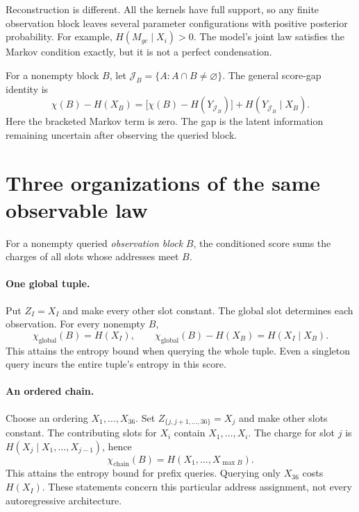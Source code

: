 \documentclass[11pt]{article}
\begin{document}
Reconstruction is different. All the kernels have full support, so any
finite observation block leaves several parameter configurations with positive
posterior probability. For example, $H(M_{gc}\mid X_i)>0$. The model's joint
law satisfies the Markov condition exactly, but it is not a perfect condensation.

For a nonempty block $B$, let $\mathcal J_B=\{A:A\cap B\ne\varnothing\}$.
The general score-gap identity is
\[
 \chi(B)-H(X_B)
 =\bigl[\chi(B)-H(Y_{\mathcal J_B})\bigr]
   +H(Y_{\mathcal J_B}\mid X_B).
\]
Here the bracketed Markov term is zero. The gap is the latent information
remaining uncertain after observing the queried block.

\newpage
\section{Three organizations of the same observable law}
For a nonempty queried \emph{observation block} $B$, the conditioned score
sums the charges of all slots whose addresses meet $B$.

\paragraph{One global tuple.}
Put $Z_I=X_I$ and make every other slot constant. The global slot determines
each observation. For every nonempty $B$,
\[
 \chi_{\mathrm{global}}(B)=H(X_I),\qquad
 \chi_{\mathrm{global}}(B)-H(X_B)=H(X_I\mid X_B).
\]
This attains the entropy bound when querying the whole tuple. Even a singleton
query incurs the entire tuple's entropy in this score.

\paragraph{An ordered chain.}
Choose an ordering $X_1,\ldots,X_{36}$. Set
$Z_{\{j,j+1,\ldots,36\}}=X_j$ and make other slots constant. The contributing
slots for $X_i$ contain $X_1,\ldots,X_i$. The charge for slot $j$ is
$H(X_j\mid X_1,\ldots,X_{j-1})$, hence
\[
 \chi_{\mathrm{chain}}(B)=H(X_1,\ldots,X_{\max B}).
\]
This attains the entropy bound for prefix queries. Querying only $X_{36}$ costs
$H(X_I)$. These statements concern this particular address assignment, not
every autoregressive architecture.
\end{document}
